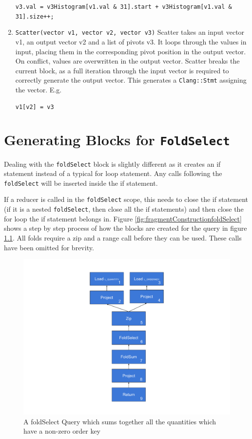 \begin{enumerate}
{\centering\texttt{v3.val = v3Histogram[v1.val \& 31].start + v3Histogram[v1.val \& 31].size++;}\par}


\item \texttt{Scatter(vector v1, vector v2, vector v3)}
Scatter takes an input vector v1, an output vector v2 and a list of pivots v3. It loops through the values in input, placing them in the corresponding pivot position in the output vector. On conflict, values are overwritten in the output vector. Scatter breaks the current block, as a full iteration through the input vector is required to correctly generate the output vector. This generates a \texttt{Clang::Stmt} assigning the vector. E.g.

{\centering\texttt{v1[v2] = v3}\par}

\end{enumerate}

\chapter{Generating Blocks for \texttt{FoldSelect}}

Dealing with the \texttt{foldSelect} block is slightly different as it creates an if statement instead of a typical for loop statement. Any calls following the \texttt{foldSelect} will be inserted inside the if statement. 

If a reducer is called in the \texttt{foldSelect} scope, this needs to close the if statement (if it is a nested \texttt{foldSelect}, then close all the if statements) and then close the for loop the if statement belongs in. Figure \ref{fig:fragmentConstructionfoldSelect} shows a step by step process of how the blocks are created for the query in figure \ref{fig:ASTfoldSelect}. All folds require a zip and a range call before they can be used. These calls have been omitted for brevity.

\begin{figure}[h]
  \centering
  \includegraphics[width=\textwidth]{appendix/foldSelectQuery.pdf}
  \caption{A foldSelect Query which sums together all the quantities which have a non-zero order key}
  \label{fig:ASTfoldSelect}
\end{figure}%

